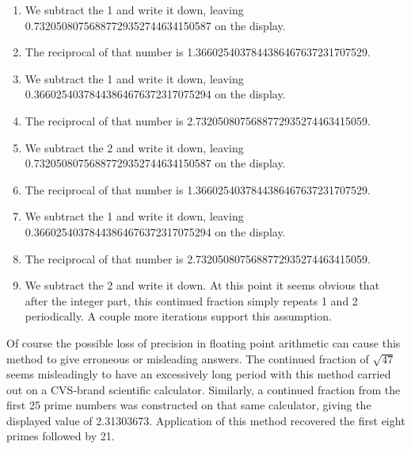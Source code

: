 \documentclass[12pt]{article}
\begin{document}
\begin{enumerate}
\item We subtract the 1 and write it down, leaving 0.73205080756887729352744634150587 on the display.
\item The reciprocal of that number is 1.3660254037844386467637231707529.
\item We subtract the 1 and write it down, leaving 0.36602540378443864676372317075294 on the display.
\item The reciprocal of that number is 2.7320508075688772935274463415059.
\item We subtract the 2 and write it down, leaving 0.73205080756887729352744634150587 on the display.
\item The reciprocal of that number is 1.3660254037844386467637231707529.
\item We subtract the 1 and write it down, leaving 0.36602540378443864676372317075294 on the display.
\item The reciprocal of that number is 2.7320508075688772935274463415059.
\item We subtract the 2 and write it down. At this point it seems obvious that after the integer part, this continued fraction simply repeats 1 and 2 periodically. A couple more iterations support this assumption.
\end{enumerate}

Of course the possible loss of precision in floating point arithmetic can cause this method to give erroneous or misleading answers. The continued fraction of $\sqrt{47}$ seems misleadingly to have an excessively long period with this method carried out on a CVS-brand scientific calculator. Similarly, a continued fraction from the first 25 prime numbers was constructed on that same calculator, giving the displayed value of 2.31303673. Application of this method recovered the first eight primes followed by 21.
\end{document}
